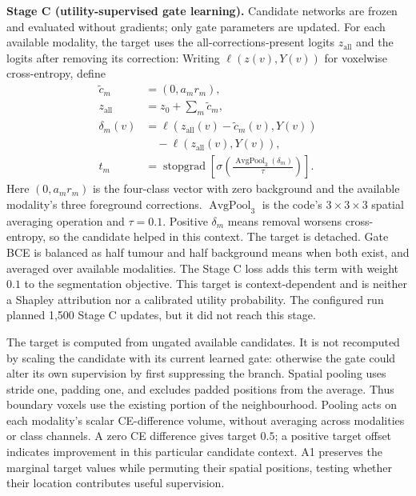 \documentclass[conference]{IEEEtran}
\begin{document}
\textbf{Stage C (utility-supervised gate learning).} Candidate networks are frozen and evaluated without gradients; only gate parameters are updated. For each available modality, the target uses the all-corrections-present logits $z_{\mathrm{all}}$ and the logits after removing its correction:
Writing $\ell(z(v),Y(v))$ for voxelwise cross-entropy, define
\begin{align}
\tilde c_m&=(0,a_mr_m),\nonumber\\
z_{\mathrm{all}}&=z_0+\sum_m\tilde c_m,
\label{eq:candidates}\\
\delta_m(v)&=\ell(z_{\mathrm{all}}(v)-\tilde c_m(v),Y(v))\nonumber\\
&\quad-\ell(z_{\mathrm{all}}(v),Y(v)),
\label{eq:delta}\\
t_m&=\operatorname{stopgrad}\!\left[
\sigma\!\left(\frac{\operatorname{AvgPool}_{3}(\delta_m)}{\tau}\right)\right].
\label{eq:utility}
\end{align}
Here $(0,a_mr_m)$ is the four-class vector with zero background and the available modality's three foreground corrections. $\operatorname{AvgPool}_{3}$ is the code's $3\times3\times3$ spatial averaging operation and $\tau=0.1$. Positive $\delta_m$ means removal worsens cross-entropy, so the candidate helped in this context. The target is detached. Gate BCE is balanced as half tumour and half background means when both exist, and averaged over available modalities. The Stage C loss adds this term with weight $0.1$ to the segmentation objective. This target is context-dependent and is neither a Shapley attribution nor a calibrated utility probability. The configured run planned 1,500 Stage C updates, but it did not reach this stage.

The target is computed from ungated available candidates. It is not recomputed by scaling the candidate with its current learned gate: otherwise the gate could alter its own supervision by first suppressing the branch. Spatial pooling uses stride one, padding one, and excludes padded positions from the average. Thus boundary voxels use the existing portion of the neighbourhood. Pooling acts on each modality's scalar CE-difference volume, without averaging across modalities or class channels. A zero CE difference gives target $0.5$; a positive target offset indicates improvement in this particular candidate context. A1 preserves the marginal target values while permuting their spatial positions, testing whether their location contributes useful supervision.
\end{document}
